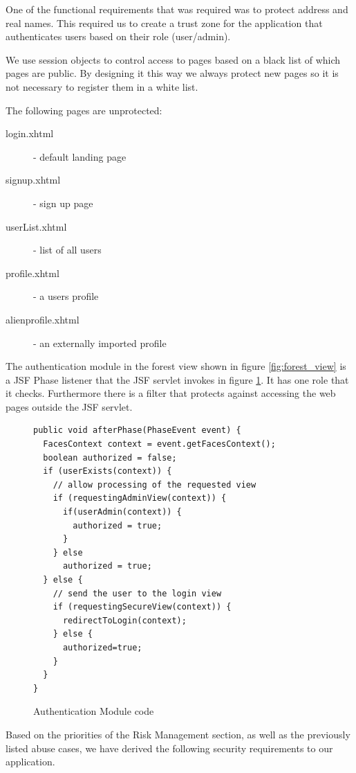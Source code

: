 \documentclass[a4paper]{article}
\begin{document}

One of the functional requirements that was required was to protect address and real names. This required us to create a trust zone for the application that authenticates users based on their role (user/admin). 

We use session objects to control access to pages based on a black list of which pages are public. By designing it this way we always protect new pages so it is not necessary to register them in a white list. 

The following pages are unprotected:
\begin{description}
\item[login.xhtml] - default landing page
\item[signup.xhtml] - sign up page
\item[userList.xhtml] - list of all users
\item[profile.xhtml] - a users profile
\item[alienprofile.xhtml] - an externally imported profile
\end{description}

The authentication module in the forest view shown in figure \ref{fig:forest_view} is a JSF Phase listener that the JSF servlet invokes in figure \ref{fig:jsf_listener}. It has one role that it checks.
Furthermore there is a filter that protects against accessing the web pages outside the JSF servlet.  
  
\begin{figure}
\caption{Authentication Module code}
\label{fig:jsf_listener}   
\begin{lstlisting}
public void afterPhase(PhaseEvent event) {
  FacesContext context = event.getFacesContext();  
  boolean authorized = false;
  if (userExists(context)) {
    // allow processing of the requested view
    if (requestingAdminView(context)) {
      if(userAdmin(context)) {
        authorized = true; 
      }                     
    } else 
      authorized = true;
  } else {            
    // send the user to the login view
    if (requestingSecureView(context)) {                
      redirectToLogin(context);
    } else {
      authorized=true;
    }
  }
}    
\end{lstlisting} 
\end{figure}

Based on the priorities of the Risk Management section, as well as the previously listed abuse cases, we have derived the following security requirements to our application.
\end{document}
